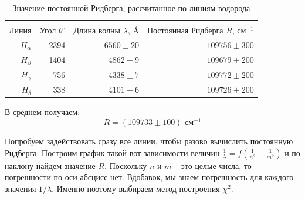\begin{enumerate}
	
	\begin{table}[h!]
		\centering
			\begin{tabular}{|r|r|r|r|}
				\hline
				&  &  & \multicolumn{1}{r|}{} \\ 
				Линия      & Угол $\theta ^\circ$ & Длина волны $\lambda$, \AA & \multicolumn{1}{r|}{Постоянная Ридберга $R$, см$^{-1}$} \\ \hline
				$H_\alpha$ & 2394                 & $6560 \pm 20$                             & $109756 \pm 300$ \\ \hline
				$H_\beta$  & 1404                 & $4862 \pm 9$                              & $109679 \pm 200$ \\ \hline
				$H_\gamma$ & 756                  & $4338 \pm 7$                              & $109772 \pm 200$ \\ \hline
				$H_\delta$ & 338                  & $4101 \pm 6$                              & $109726 \pm 200$ \\ \hline
			\end{tabular}
		\caption{Значение постоянной Ридберга, рассчитанное по линиям водорода}
		\label{HydrogenSpectre_RydbergTable}
	\end{table}
	
	В среднем получаем:
	\begin{equation*}
		\boxed{R = (109733 \pm 100) \text{ см}^{-1}}  \iffalse 117 \fi
	\end{equation*}

	Попробуем задействовать сразу все линии, чтобы разово вычислить постоянную Ридберга.
	Построим график такой вот зависимости величин $\frac{1}{\lambda} = f\left(\frac{1}{n^2} - \frac{1}{m^2}\right)$ и по наклону найдем значение $R$. Поскольку $n$ и $m$ -- это целые числа, то погрешности по оси абсцисс нет. Вдобавок, мы знаем погрешность для каждого значения $1/\lambda$. Именно поэтому выбираем метод построения $\chi^2$.

	
	

\end{enumerate}
